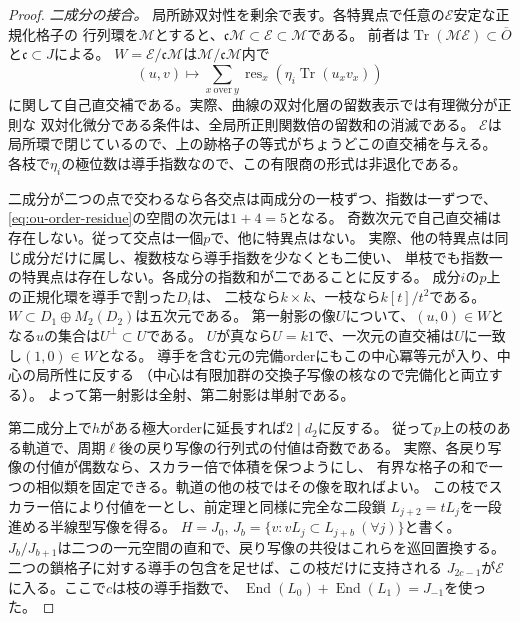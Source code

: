 \documentclass[11pt,a4paper]{ltjsarticle}
\theoremstyle{definition}
\begin{document}
\begin{proof}
\emph{二成分の接合。}
局所跡双対性を剰余で表す。各特異点で任意の$\mathcal E$安定な正規化格子の
行列環を$\mathcal M$とすると、$\mathfrak c\mathcal M\subset\mathcal E\subset\mathcal M$である。
前者は$\operatorname{Tr}(\mathcal M\mathcal E)\subset\overline O$と$\mathfrak c\subset J$による。
$W=\mathcal E/\mathfrak c\mathcal M$は$\mathcal M/\mathfrak c\mathcal M$内で
\[
                (u,v)\longmapsto
                \sum_{x\ \mathrm{over}\ y}\operatorname{res}_x
                    (\eta_i\operatorname{Tr}(u_xv_x))
                                                               \tag{2}\label{eq:ou-order-residue}
\]
に関して自己直交補である。実際、曲線の双対化層の留数表示では有理微分が正則な
双対化微分である条件は、全局所正則関数倍の留数和の消滅である\cite{Rosenlicht1952}。
$\mathcal E$は局所環で閉じているので、上の跡格子の等式がちょうどこの直交補を与える。
各枝で$\eta_i$の極位数は導手指数なので、この有限商の形式は非退化である。

二成分が二つの点で交わるなら各交点は両成分の一枝ずつ、指数は一ずつで、
\eqref{eq:ou-order-residue}の空間の次元は$1+4=5$となる。
奇数次元で自己直交補は存在しない。従って交点は一個$p$で、他に特異点はない。
実際、他の特異点は同じ成分だけに属し、複数枝なら導手指数を少なくとも二使い、
単枝でも指数一の特異点は存在しない。各成分の指数和が二であることに反する。
成分$i$の$p$上の正規化環を導手で割った$D_i$は、
二枝なら$k\times k$、一枝なら$k[t]/t^2$である。
$W\subset D_1\oplus M_2(D_2)$は五次元である。
第一射影の像$U$について、$(u,0)\in W$となる$u$の集合は$U^\perp\subset U$である。
$U$が真なら$U=k1$で、一次元の直交補は$U$に一致し$(1,0)\in W$となる。
導手を含む元の完備orderにもこの中心冪等元が入り、中心の局所性に反する
（中心は有限加群の交換子写像の核なので完備化と両立する）。
よって第一射影は全射、第二射影は単射である。

第二成分上で$h$がある極大orderに延長すれば$2\mid d_2$に反する。
従って$p$上の枝のある軌道で、周期$\ell$後の戻り写像の行列式の付値は奇数である。
実際、各戻り写像の付値が偶数なら、スカラー倍で体積を保つようにし、
有界な格子の和で一つの相似類を固定できる。軌道の他の枝ではその像を取ればよい。
この枝でスカラー倍により付値を一とし、前定理と同様に完全な二段鎖
$L_{j+2}=tL_j$を一段進める半線型写像を得る。
$H=J_0$, $J_b=\{v:vL_j\subset L_{j+b}\ (\forall j)\}$と書く。
$J_b/J_{b+1}$は二つの一元空間の直和で、戻り写像の共役はこれらを巡回置換する。
二つの鎖格子に対する導手の包含を足せば、この枝だけに支持される
$J_{2c-1}$が$\mathcal E$に入る。ここで$c$は枝の導手指数で、
$\operatorname{End}(L_0)+\operatorname{End}(L_1)=J_{-1}$を使った。


\end{proof}
\end{document}
